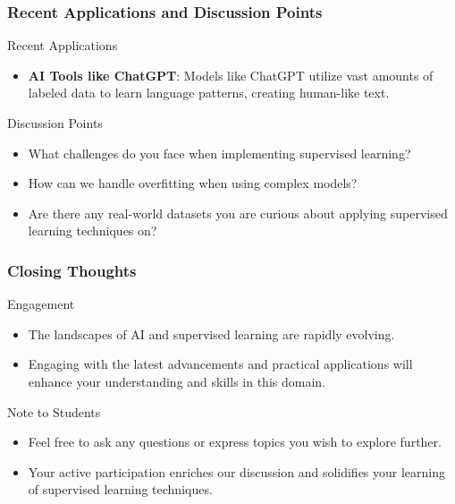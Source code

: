 \documentclass[aspectratio=169]{beamer}
\begin{document}
\begin{frame}[fragile]
    \frametitle{Recent Applications and Discussion Points}
    
    \begin{block}{Recent Applications}
        \begin{itemize}
            \item \textbf{AI Tools like ChatGPT}: Models like ChatGPT utilize vast amounts of labeled data to learn language patterns, creating human-like text.
        \end{itemize}
    \end{block}
    
    \begin{block}{Discussion Points}
        \begin{itemize}
            \item What challenges do you face when implementing supervised learning?
            \item How can we handle overfitting when using complex models?
            \item Are there any real-world datasets you are curious about applying supervised learning techniques on?
        \end{itemize}
    \end{block}
\end{frame}

\begin{frame}[fragile]
    \frametitle{Closing Thoughts}
    
    \begin{block}{Engagement}
        \begin{itemize}
            \item The landscapes of AI and supervised learning are rapidly evolving.
            \item Engaging with the latest advancements and practical applications will enhance your understanding and skills in this domain.
        \end{itemize}
    \end{block}
    
    \begin{block}{Note to Students}
        \begin{itemize}
            \item Feel free to ask any questions or express topics you wish to explore further.
            \item Your active participation enriches our discussion and solidifies your learning of supervised learning techniques.
        \end{itemize}
    \end{block}
\end{frame}
\end{document}
